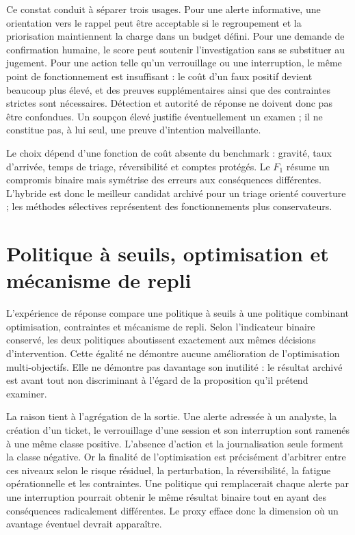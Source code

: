 \documentclass[11pt,a4paper,oneside]{report}
\theoremstyle{definition}
\theoremstyle{plain}
\begin{document}
Ce constat conduit à séparer trois usages. Pour une alerte informative, une
orientation vers le rappel peut être acceptable si le regroupement et la
priorisation maintiennent la charge dans un budget défini. Pour une demande de
confirmation humaine, le score peut soutenir l'investigation sans se
substituer au jugement. Pour une action telle qu'un verrouillage ou une
interruption, le même point de fonctionnement est insuffisant : le coût d'un
faux positif devient beaucoup plus élevé, et des preuves supplémentaires ainsi
que des contraintes strictes sont nécessaires. Détection et autorité de
réponse ne doivent donc pas être confondues. Un soupçon élevé justifie
éventuellement un examen ; il ne constitue pas, à lui seul, une preuve
d'intention malveillante.

Le choix dépend d'une fonction de coût absente du benchmark : gravité, taux
d'arrivée, temps de triage, réversibilité et comptes protégés. Le \(F_1\)
résume un compromis binaire mais symétrise des erreurs aux conséquences
différentes. L'hybride est donc le meilleur candidat archivé pour un triage
orienté couverture ; les méthodes sélectives représentent des fonctionnements
plus conservateurs.

\section{Politique à seuils, optimisation et mécanisme de repli}
\label{sec:validation-response}

L'expérience de réponse compare une politique à seuils à une politique
combinant optimisation, contraintes et mécanisme de repli. Selon l'indicateur
binaire conservé, les deux politiques aboutissent exactement aux mêmes
décisions d'intervention. Cette égalité ne démontre aucune amélioration de
l'optimisation multi-objectifs. Elle ne démontre pas davantage son inutilité :
le résultat archivé est avant tout non discriminant à l'égard de la proposition
qu'il prétend examiner.

La raison tient à l'agrégation de la sortie. Une alerte adressée à un analyste,
la création d'un ticket, le verrouillage d'une session et son interruption sont
ramenés à une même classe positive. L'absence d'action et la journalisation
seule forment la classe négative. Or la finalité de l'optimisation est
précisément d'arbitrer entre ces niveaux selon le risque résiduel, la
perturbation, la réversibilité, la fatigue opérationnelle et les contraintes.
Une politique qui remplacerait chaque alerte par une interruption pourrait
obtenir le même résultat binaire tout en ayant des conséquences radicalement
différentes. Le proxy efface donc la dimension où un avantage éventuel devrait
apparaître.
\end{document}
